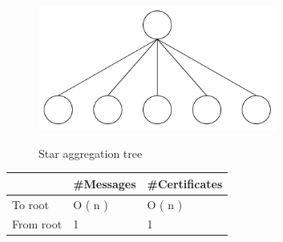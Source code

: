 	\begin{figure}[t]\label{star-aggregation-tree}
		\centering
			\includegraphics[width=0.7\textwidth]{images/star-aggregation-tree.png}\\
			\caption{Star aggregation tree}
	\end{figure}
	\begin{tabular}{ | l | l | l |}
		\hline
			\ & \#Messages & \#Certificates \\
		\hline
			To root	& O ( n ) & O ( n ) \\
		\hline
			From root & 1 & 1 \\
		\hline 
	\end{tabular}
		\newline
		\newline

